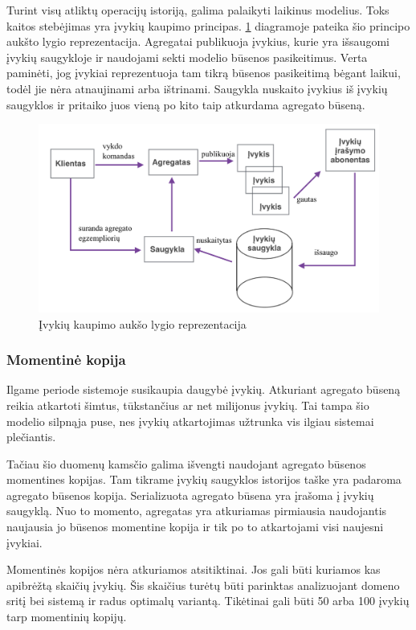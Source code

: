 Turint visų atliktų operacijų istoriją, galima palaikyti laikinus modelius. Toks kaitos stebėjimas yra įvykių kaupimo principas. \ref{pic:es} diagramoje pateika šio principo aukšto lygio reprezentacija. Agregatai publikuoja įvykius, kurie yra išsaugomi įvykių saugykloje ir naudojami sekti modelio būsenos pasikeitimus. Verta paminėti, jog įvykiai reprezentuoja tam tikrą būsenos pasikeitimą bėgant laikui, todėl jie nėra atnaujinami arba ištrinami. Saugykla nuskaito įvykius iš įvykių saugyklos ir pritaiko juos vieną po kito taip atkurdama agregato būseną. 

\begin{figure}[ht]
	\centering
	\includegraphics[width=0.9\linewidth]{pics/es.png}
	\caption{Įvykių kaupimo aukšo lygio reprezentacija}
	\label{pic:es}
\end{figure}

\subsubsection{Momentinė kopija}

Ilgame periode sistemoje susikaupia daugybė įvykių. Atkuriant agregato būseną reikia atkartoti šimtus, tūkstančius ar net milijonus įvykių. Tai tampa šio modelio silpnąja puse, nes įvykių atkartojimas užtrunka vis ilgiau sistemai plečiantis.

Tačiau šio duomenų kamsčio galima išvengti naudojant agregato būsenos momentines kopijas. Tam tikrame įvykių saugyklos istorijos taške yra padaroma agregato būsenos kopija. Serializuota agregato būsena yra įrašoma į įvykių saugyklą. Nuo to momento, agregatas yra atkuriamas pirmiausia naudojantis naujausia jo būsenos momentine kopija ir tik po to atkartojami visi naujesni įvykiai.

Momentinės kopijos nėra atkuriamos atsitiktinai. Jos gali būti kuriamos kas apibrėžtą skaičių įvykių. Šis skaičius turėtų būti parinktas analizuojant domeno sritį bei sistemą ir radus optimalų variantą. Tikėtinai gali būti 50 arba 100 įvykių tarp momentinių kopijų.

